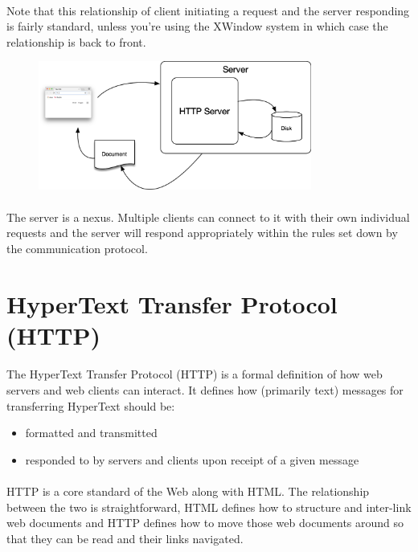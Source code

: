 \paragraph{} Note that this relationship of  client initiating a request and the server responding is fairly standard, unless you’re using the XWindow system in which case the relationship is back to front.

\begin{figure}[H]
\centering
\includegraphics[width=0.8\textwidth]{figures/client-server}
\label{fig:client-server}
\caption{}
\end{figure}


\paragraph{} The server is a nexus. Multiple clients can connect to it with their own individual requests and the server will respond appropriately within the rules set down by the communication protocol.


\section{HyperText Transfer Protocol (HTTP)}
\paragraph{} The HyperText Transfer Protocol (HTTP) is a formal definition of how web servers and web clients can interact. It defines how (primarily text) messages for transferring HyperText should be:

\begin{itemize}
\item formatted and transmitted
\item responded to by servers and clients upon receipt of a given message
\end{itemize}

\paragraph{} HTTP is a core standard of the Web along with HTML. The relationship between the two is straightforward, HTML defines how to structure and inter-link web documents and HTTP defines how to move those web documents around so that they can be read and their links navigated.

